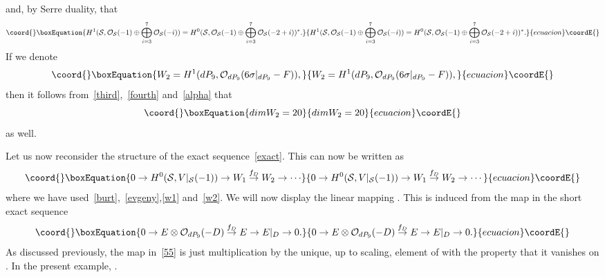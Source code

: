 \documentclass[a4paper,12pt]{article}
\numberwithin{equation}{section}
\theoremstyle{plain}
\begin{document}
%
and, by Serre duality, that
%
\begin{equation}\coord{}\boxEquation{
H^{1} ({\cal S}, {\cal O}_{{\cal S}}(-1) \oplus
\bigoplus_{i=3}^{7} {\cal O}_{{\cal S}}(-i))
=
H^{0} ({\cal S}, {\cal O}_{{\cal S}}(-1) \oplus
\bigoplus_{i=3}^{7} {\cal O}_{{\cal S}}(-2+i))^{*}.
\label{fourth}
}{
H^{1} ({\cal S}, {\cal O}_{{\cal S}}(-1) \oplus
\bigoplus_{i=3}^{7} {\cal O}_{{\cal S}}(-i))
=
H^{0} ({\cal S}, {\cal O}_{{\cal S}}(-1) \oplus
\bigoplus_{i=3}^{7} {\cal O}_{{\cal S}}(-2+i))^{*}.
}{ecuacion}\coordE{}\end{equation}
%
If we denote
%
\begin{equation}\coord{}\boxEquation{
W_2 = H^{1} (dP_9, {\cal O}_{dP_9} (6 \sigma|_{dP_9} -F)),
\label{w2}
}{
W_2 = H^{1} (dP_9, {\cal O}_{dP_9} (6 \sigma|_{dP_9} -F)),
}{ecuacion}\coordE{}\end{equation}
%
then it follows from~\eqref{third},~\eqref{fourth} and~\eqref{alpha} that
%
\begin{equation}\coord{}\boxEquation{
dim W_2 =20
\label{54}
}{
dim W_2 =20
}{ecuacion}\coordE{}\end{equation}
%
as well.

Let us now reconsider the structure of the exact sequence~\eqref{exact}.
This can now be written as
%
\begin{equation}\coord{}\boxEquation{
0 \rightarrow H^{0}({\cal S}, V|_{\cal S}(-1))
\rightarrow W_1 \stackrel{f_D}{\rightarrow} W_2 \rightarrow \cdots
\label{ww}
}{
0 \rightarrow H^{0}({\cal S}, V|_{\cal S}(-1))
\rightarrow W_1 \stackrel{f_D}{\rightarrow} W_2 \rightarrow \cdots
}{ecuacion}\coordE{}\end{equation}
%
where we have used~\eqref{burt},~\eqref{evgeny},\eqref{w1} and~\eqref{w2}.
We will now display the linear mapping \coordHE{}. This is induced
from the map \coordHE{} in the short exact sequence
%
\begin{equation}\coord{}\boxEquation{
0 \rightarrow E \otimes {\cal O}_{dP_9} (-D)
\stackrel{f_D}{\rightarrow} E
\rightarrow E|_{D} \rightarrow 0.
\label{55}
}{
0 \rightarrow E \otimes {\cal O}_{dP_9} (-D)
\stackrel{f_D}{\rightarrow} E
\rightarrow E|_{D} \rightarrow 0.
}{ecuacion}\coordE{}\end{equation}
%
As discussed previously, the map \coordHE{} in~\eqref{55} is just
multiplication
by the unique, up to scaling, element of \coordHE{} with the
property that it vanishes on \coordHE{}. In the present example,
\coordHE{}.
\end{document}
